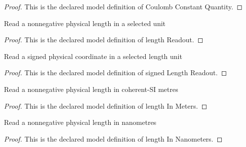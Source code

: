 \begin{proof}
  This is the declared model definition of Coulomb Constant Quantity.
\end{proof}
\begin{definition}
  \label{def:physics:phyx-mini-0854:phyxminiproblems-problemphyxmini0854-lengthreadout}
  Read a nonnegative physical length in a selected unit
\end{definition}
\begin{proof}
  This is the declared model definition of length Readout.
\end{proof}
\begin{definition}
  \label{def:physics:phyx-mini-0854:phyxminiproblems-problemphyxmini0854-signedlengthreadout}
  Read a signed physical coordinate in a selected length unit
\end{definition}
\begin{proof}
  This is the declared model definition of signed Length Readout.
\end{proof}
\begin{definition}
  \label{def:physics:phyx-mini-0854:phyxminiproblems-problemphyxmini0854-lengthinmeters}
  Read a nonnegative physical length in coherent-SI metres
\end{definition}
\begin{proof}
  This is the declared model definition of length In Meters.
\end{proof}
\begin{definition}
  \label{def:physics:phyx-mini-0854:phyxminiproblems-problemphyxmini0854-lengthinnanometers}
  Read a nonnegative physical length in nanometres
\end{definition}
\begin{proof}
  This is the declared model definition of length In Nanometers.
\end{proof}
